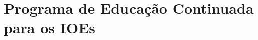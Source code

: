 \chapter{Programa de Educação Continuada para os IOEs}
\label{ch:programa_educacao_continuada}

\vfill